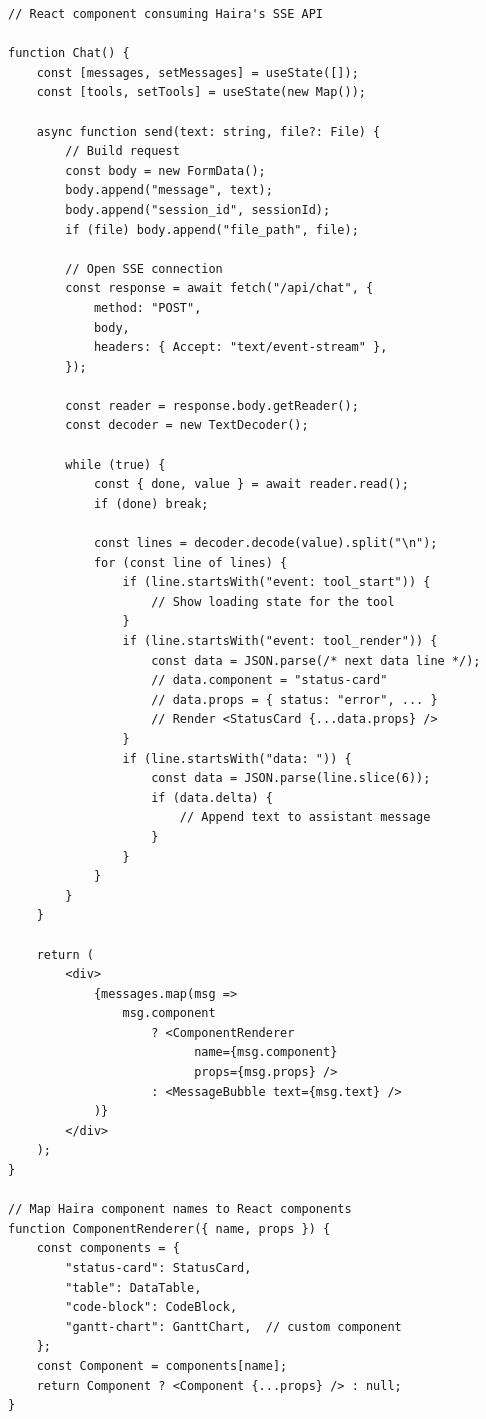 \begin{lstlisting}[language={}]
// React component consuming Haira's SSE API

function Chat() {
    const [messages, setMessages] = useState([]);
    const [tools, setTools] = useState(new Map());

    async function send(text: string, file?: File) {
        // Build request
        const body = new FormData();
        body.append("message", text);
        body.append("session_id", sessionId);
        if (file) body.append("file_path", file);

        // Open SSE connection
        const response = await fetch("/api/chat", {
            method: "POST",
            body,
            headers: { Accept: "text/event-stream" },
        });

        const reader = response.body.getReader();
        const decoder = new TextDecoder();

        while (true) {
            const { done, value } = await reader.read();
            if (done) break;

            const lines = decoder.decode(value).split("\n");
            for (const line of lines) {
                if (line.startsWith("event: tool_start")) {
                    // Show loading state for the tool
                }
                if (line.startsWith("event: tool_render")) {
                    const data = JSON.parse(/* next data line */);
                    // data.component = "status-card"
                    // data.props = { status: "error", ... }
                    // Render <StatusCard {...data.props} />
                }
                if (line.startsWith("data: ")) {
                    const data = JSON.parse(line.slice(6));
                    if (data.delta) {
                        // Append text to assistant message
                    }
                }
            }
        }
    }

    return (
        <div>
            {messages.map(msg =>
                msg.component
                    ? <ComponentRenderer
                          name={msg.component}
                          props={msg.props} />
                    : <MessageBubble text={msg.text} />
            )}
        </div>
    );
}

// Map Haira component names to React components
function ComponentRenderer({ name, props }) {
    const components = {
        "status-card": StatusCard,
        "table": DataTable,
        "code-block": CodeBlock,
        "gantt-chart": GanttChart,  // custom component
    };
    const Component = components[name];
    return Component ? <Component {...props} /> : null;
}
\end{lstlisting}

